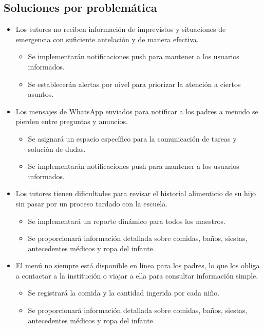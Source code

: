 \documentclass{article}
\begin{document}
\subsection{Soluciones por problemática}
\begin{itemize}

	\item Los tutores no reciben información de imprevistos y situaciones de emergencia con suficiente antelación y de manera efectiva.
	      \begin{itemize}
		      \item Se implementarán notificaciones push para mantener a los usuarios informados.
		      \item Se establecerán alertas por nivel para priorizar la atención a ciertos asuntos.
	      \end{itemize}

	\item Los mensajes de WhatsApp enviados para notificar a los padres a menudo se pierden entre preguntas y anuncios.
	      \begin{itemize}
		      \item Se asignará un espacio específico para la comunicación de tareas y solución de dudas.
		      \item Se implementarán notificaciones push para mantener a los usuarios informados.
	      \end{itemize}

	\item Los tutores tienen dificultades para revisar el historial alimenticio de su hijo sin pasar por un proceso tardado con la escuela.
	      \begin{itemize}
		      \item Se implementará un reporte dinámico para todos los maestros.
		      \item Se proporcionará información detallada sobre comidas, baños, siestas, antecedentes médicos y ropa del infante.
	      \end{itemize}

	\item El menú no siempre está disponible en línea para los padres, lo que los obliga a contactar a la institución o viajar a ella para consultar información simple.
	      \begin{itemize}
		      \item Se registrará la comida y la cantidad ingerida por cada niño.
		      \item Se proporcionará información detallada sobre comidas, baños, siestas, antecedentes médicos y ropa del infante.
	      \end{itemize}



\end{itemize}
\end{document}
